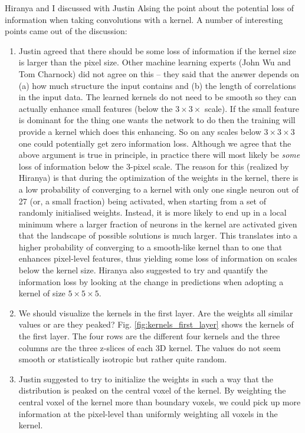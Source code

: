 \documentclass[11pt]{article}
\begin{document}
Hiranya and I discussed with Justin Alsing the point about the potential loss of information when taking convolutions with a kernel. A number of interesting points came out of the discussion:
\begin{enumerate}
\item Justin agreed that there should be some loss of information if the kernel size is larger than the pixel size. Other machine learning experts (John Wu and Tom Charnock) did not agree on this -- they said that the answer depends on (a) how much structure the input contains and (b) the length of correlations in the input data. The learned kernels do not need to be smooth so they can actually enhance small features (below the $3\times3\times$ scale). If the small feature is dominant for the thing one wants the network to do then the training will provide a kernel which does this enhancing. So on any scales below $3\times3\times3$ one could potentially get zero information loss. Although we agree that the above argument is true in principle, in practice there will most likely be \textit{some} loss of information below the 3-pixel scale. The reason for this (realized by Hiranya) is that during the optimization of the weights in the kernel, there is a low probability of converging to a kernel with only one single neuron out of 27 (or, a small fraction) being activated, when starting from a set of randomly initialised weights. Instead, it is more likely to end up in a local minimum where a larger fraction of neurons in the kernel are activated given that the landscape of possible solutions is much larger. This translates into a higher probability of converging to a smooth-like kernel than to one that enhances pixel-level features, thus yielding some loss of information on scales below the kernel size. Hiranya also suggested to try and quantify the information loss by looking at the change in predictions when adopting a kernel of size $5\times5\times5$.
\item We should visualize the kernels in the first layer. Are the weights all similar values or are they peaked? Fig. \ref{fig:kernels_first_layer} shows the kernels of the first layer. The four rows are the different four kernels and the three columns are the three z-slices of each 3D kernel. The values do not seem smooth or statistically isotropic but rather quite random.
\item Justin suggested to try to initialize the weights in such a way that the distribution is peaked on the central voxel of the kernel. By weighting the central voxel of the kernel more than boundary voxels, we could pick up more information at the pixel-level than uniformly weighting all voxels in the kernel.

\end{enumerate}
\end{document}
